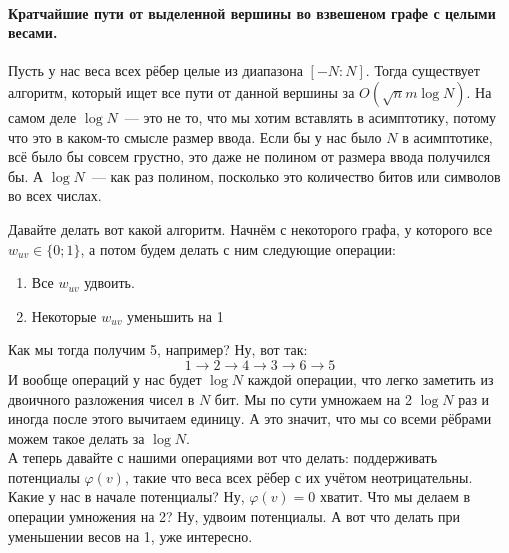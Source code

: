 \documentclass{article}
\begin{document}
    \paragraph{Кратчайшие пути от выделенной вершины во взвешеном графе с целыми весами.}
    Пусть у нас веса всех рёбер целые из диапазона $[-N:N]$. Тогда существует алгоритм, который ищет все пути от данной вершины за $O(\sqrt nm\log N)$. На самом деле $\log N$~--- это не то, что мы хотим вставлять в асимптотику, потому что это в каком-то смысле размер ввода. Если бы у нас было $N$ в асимптотике, всё было бы совсем грустно, это даже не полином от размера ввода получился бы. А $\log N$~--- как раз полином, посколько это количество битов или символов во всех числах.
    \begin{figure}[H]
    \end{figure}\noindent
    Давайте делать вот какой алгоритм. Начнём с некоторого графа, у которого все $w_{uv}\in\{0;1\}$, а потом будем делать с ним следующие операции:
    \begin{multicols}{2}
        \begin{enumerate}
            \item Все $w_{uv}$ удвоить.
            \item Некоторые $w_{uv}$ уменьшить на 1
        \end{enumerate}
    \end{multicols}
    Как мы тогда получим 5, например? Ну, вот так:
    $$
    1\to2\to4\to3\to6\to5
    $$
    И вообще операций у нас будет $\log N$ каждой операции, что легко заметить из двоичного разложения чисел в $N$ бит. Мы по сути умножаем на 2 $\log N$ раз и иногда после этого вычитаем единицу. А это значит, что мы со всеми рёбрами можем такое делать за $\log N$.\\
    А теперь давайте с нашими операциями вот что делать: поддерживать потенциалы $\varphi(v)$, такие что веса всех рёбер с их учётом неотрицательны. Какие у нас в начале потенциалы? Ну, $\varphi(v)=0$ хватит. Что мы делаем в операции умножения на 2? Ну, удвоим потенциалы. А вот что делать при уменьшении весов на 1, уже интересно.\\
\end{document}
